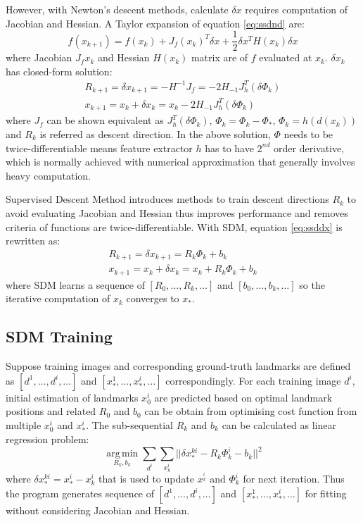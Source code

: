 However, with Newton's descent methods, calculate $\delta x$ requires computation of Jacobian and Hessian. A Taylor expansion of equation \ref{eq:ssdnd} are:
\begin{equation}
\label{eq:ssdndtaylor}
f(x_{k+1})=f(x_k)+J_f(x_k)^T\delta x+\frac{1}{2}\delta x^TH(x_k)\delta x
\end{equation}
where Jacobian $J_f{x_k}$ and Hessian $H(x_k)$ matrix are of $f$ evaluated at $x_k$. $\delta x_k$ has closed-form solution:
\begin{align}
\label{eq:ssddx}
R_{k+1}=\delta x_{k+1} = -H^{-1}J_f = -2H_{-1}J^T_h(\delta \Phi_k) \\
x_{k+1}=x_k+\delta x_k = x_{k}-2H_{-1}J^T_h(\delta \Phi_k)
\end{align}
where $J_f$ can be shown equivalent as $J^T_h(\delta \Phi_k)$, $\Phi_k=\Phi_k-\Phi_*$, $\Phi_k=h(d(x_k))$ and $R_k$ is referred as descent direction. In the above solution, $\Phi$ needs to be twice-differentiable means feature extractor $h$ has to have $2^{nd}$ order derivative, which is normally achieved with numerical approximation that generally involves heavy computation.

Supervised Descent Method introduces methods to train descent directions $R_k$ to avoid evaluating Jacobian and Hessian thus improves performance and removes criteria of functions are twice-differentiable. With SDM, equation \ref{eq:ssddx} is rewritten as:
\begin{align}
\label{eq:ssdrx}
R_{k+1}=\delta x_{k+1} = R_k\Phi_k + b_k \\
x_{k+1}=x_k+\delta x_k = x_{k}+R_k\Phi_k + b_k
\end{align}
where SDM learns a sequence of $[R_0,\dotsc,R_k,\dotsc]$ and $[b_0,\dotsc,b_k,\dotsc]$ so the iterative computation of $x_k$ converges to $x_*$.

\subsection{SDM Training}
Suppose training images and corresponding ground-truth landmarks are defined as $[d^1,\dotsc,d^i,\dotsc]$ and $[x^1_*,\dotsc,x^i_*,\dotsc]$ correspondingly. For each training image $d^i$, initial estimation of landmarks $x^i_0$ are predicted based on optimal landmark positions and related $R_0$ and $b_0$ can be obtain from optimising cost function from multiple $x^i_0$ and $x^i_*$. The sub-sequential $R_k$ and $b_k$ can be calculated as linear regression problem:
\begin{equation}
\operatorname*{arg\,min}_{R_k,b_k}\sum_{d^i}\sum_{x^i_k}||\delta x^{ki}_*-R_k\Phi^i_k-b_k||^2
\end{equation}
where $\delta x^{ki}_*=x^i_*-x^i_k$ that is used to update $x^{^i_k}$ and $\Phi^i_k$ for next iteration. Thus the program generates sequence of $[d^1,\dotsc,d^i,\dotsc]$ and $[x^1_*,\dotsc,x^i_*,\dotsc]$ for fitting without considering Jacobian and Hessian.
